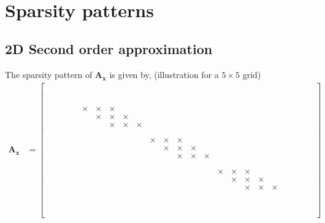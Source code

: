\documentclass[12 pt, final]{article}
\renewcommand{\d}{\times}
\begin{document}
\begin{itemize}
\begin{itemize}
\begin{itemize}
\begin{table}[H]
{\begin{tabular}{|c|c|c|c|}
            \end{tabular}}\\
            \end{table}   
        \end{itemize}
    \end{itemize}
\end{itemize}
\bigskip
\appendix
\section{Sparsity patterns}\label{A}
\subsection{2D Second order approximation}\label{A.1}
        The sparsity pattern of $\mathbf{A_x}$ is given by, (illustration for a $5\times5$ grid)
         \begin{align*}
                \mathbf{A_x} &= \left[\begin{smallmatrix} 
                \\
                & \\
                && \\
                &&& \\
                &&&& \\
                &&&&& \\
                &&&&& \d & \d & \d\\
                &&&&&& \d & \d & \d\\
                &&&&&&& \d & \d & \d\\
                &&&&&&&& \\
                &&&&&&&&& \\
                &&&&&&&&&& \d & \d & \d\\ 
                &&&&&&&&&&& \d & \d & \d\\
                &&&&&&&&&&&& \d & \d & \d\\
                &&&&&&&&&&&& \\
                &&&&&&&&&&&&& \\
                &&&&&&&&&&&&&&& \d & \d & \d\\
                &&&&&&&&&&&&&&&& \d & \d & \d\\
                &&&&&&&&&&&&&&&&& \d & \d & \d\\
                &&&&&&&&&&&&&&&&&&& \\
                &&&&&&&&&&&&&&&&&&&& \\
                &&&&&&&&&&&&&&&&&&&&& \\
                &&&&&&&&&&&&&&&&&&&&&& \\
                &&&&&&&&&&&&&&&&&&&&&&& \\
                &&&&&&&&&&&&&&&&&&&&&&&& \\
                \end{smallmatrix}\right]
            \end{align*}
\end{document}

